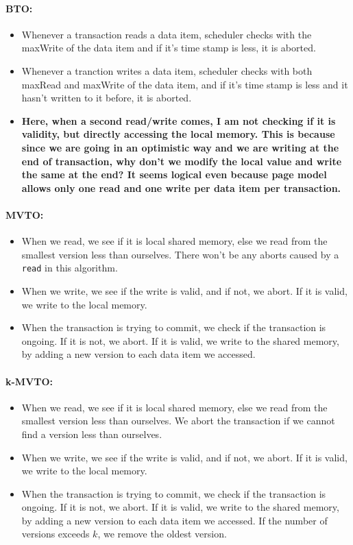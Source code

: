 \documentclass[10pt]{article}
\begin{document}
\paragraph{BTO:}
\begin{itemize}
    \item Whenever a transaction reads a data item, scheduler checks with the maxWrite of the data item and if it's time stamp is less, it is aborted.
    \item Whenever a tranction writes a data item, scheduler checks with both maxRead and maxWrite of the data item, and if it's time stamp is less and it hasn't written to it before, it is aborted.
    \item \textbf{Here, when a second read/write comes, I am not checking if it is validity, but directly accessing the local memory. This is because since we are going in an optimistic way and we are writing at the end of transaction, why don't we modify the local value and write the same at the end? It seems logical even because page model allows only one read and one write per data item per transaction.}
\end{itemize}


\paragraph{MVTO:}
\begin{itemize}
    \item When we read, we see if it is local shared memory, else we read from the smallest version less than ourselves. There won't be any aborts caused by a \texttt{read} in this algorithm.
    \item When we write, we see if the write is valid, and if not, we abort. If it is valid, we write to the local memory.
    \item When the transaction is trying to commit, we check if the transaction is ongoing. If it is not, we abort. If it is valid, we write to the shared memory, by adding a new version to each data item we accessed.
\end{itemize}

\paragraph{k-MVTO:}
\begin{itemize}
    \item When we read, we see if it is local shared memory, else we read from the smallest version less than ourselves. We abort the transaction if we cannot find a version less than ourselves.
    \item When we write, we see if the write is valid, and if not, we abort. If it is valid, we write to the local memory.
    \item When the transaction is trying to commit, we check if the transaction is ongoing. If it is not, we abort. If it is valid, we write to the shared memory, by adding a new version to each data item we accessed. If the number of versions exceeds $k$, we remove the oldest version.
\end{itemize}
\end{document}
